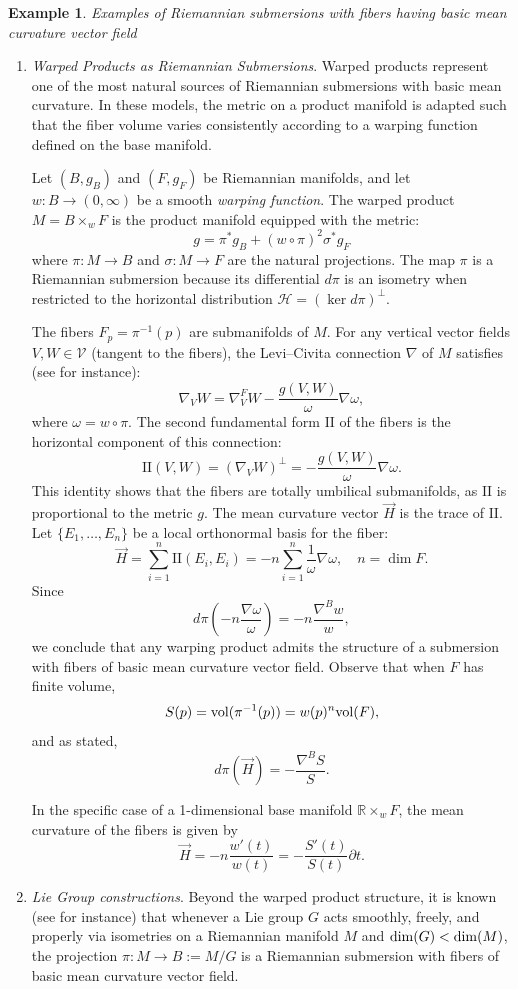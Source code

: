 \documentclass{amsart}
\theoremstyle{definition}
\newtheorem{example}[theorem]{Example}
\theoremstyle{remark}
\numberwithin{equation}{section}
\begin{document}
\begin{example}\label{expwap}\emph{Examples of Riemannian submersions with fibers having basic mean curvature vector field}
\begin{enumerate}
 \item \emph{Warped Products as Riemannian Submersions}. Warped products represent one of the most natural sources of Riemannian submersions with basic mean curvature. In these models, the metric on a product manifold is adapted such that the fiber volume  varies consistently according to a warping function defined on the base manifold.

Let $(B, g_B)$ and $(F, g_F)$ be Riemannian manifolds, and let $w: B \to (0, \infty)$ be a smooth \emph{warping function}. The warped product $M = B \times_w F$ is the product manifold equipped with the metric:
\[ g = \pi^* g_B + (w \circ \pi)^2 \sigma^* g_F \]
where $\pi: M \to B$ and $\sigma: M \to F$ are the natural projections. The map $\pi$ is a Riemannian submersion because its differential $d\pi$ is an isometry when restricted to the horizontal distribution $\mathcal{H} = (\ker d\pi)^\perp$.

The fibers $F_p = \pi^{-1}(p)$ are submanifolds of $M$. For any vertical vector fields $V, W \in \mathcal{V}$ (tangent to the fibers), the Levi--Civita connection $\nabla$ of $M$ satisfies (see \cite{Oneill} for instance):
\[ \nabla_V W = \nabla^F_V W - \frac{g(V, W)}{\omega} \nabla\omega, \]
where $\omega=w\circ \pi$. The second fundamental form $\mathrm{II}$ of the fibers is the horizontal component of this connection:
\[ \mathrm{II}(V, W) = (\nabla_V W)^\perp = - \frac{g(V, W)}{\omega} \nabla\omega. \]
This identity shows that the fibers are totally umbilical submanifolds, as $\mathrm{II}$ is proportional to the metric $g$. The mean curvature vector $\vec{H}$ is the trace of $\mathrm{II}$. Let $\{E_1, \dots, E_n\}$ be a local orthonormal basis for the fiber:
\[ \vec{H} = \sum_{i=1}^n \mathrm{II}(E_i, E_i) = -n\sum_{i=1}^n \frac{1}{\omega}\nabla\omega,\quad n = \dim F. \]
Since 
$$
d\pi\left(-n \frac{\nabla\omega}{\omega}\right)=-n\frac{\nabla^Bw}{w},
$$
we conclude that any warping product admits the structure of a submersion with fibers of basic mean curvature vector field. Observe that when $F$ has finite volume,
$$
S(p)= {\rm vol}(\pi^{-1}(p))=w(p)^n{\rm vol}(F),
$$
and as stated,
$$
d\pi(\vec H)=-\frac{\nabla^B S}{S}.
$$

In the specific case of a 1-dimensional base manifold $\mathbb{R}\times_wF$, the mean curvature of the fibers is given by
$$
\vec{H}=-n\frac{w'(t)}{w(t)}=-\frac{S'(t)}{S(t)}\partial t.
$$
\item \emph{Lie Group constructions}. Beyond the warped product structure, it is known (see \cite{Polymerakis2021} for instance) that whenever a Lie group $G$ acts smoothly, freely, and properly via isometries on a Riemannian manifold $M$ and ${\rm dim}(G)<{\rm dim}(M)$, the projection $\pi:M\to B:=M/G$ is a Riemannian submersion with fibers of basic mean curvature vector field.


\end{enumerate}
\end{example}
\end{document}

